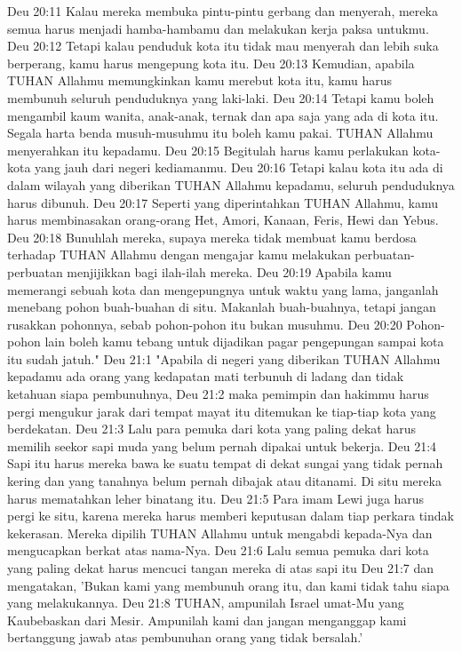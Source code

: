 Deu 20:11  Kalau mereka membuka pintu-pintu gerbang dan menyerah, mereka semua harus menjadi hamba-hambamu dan melakukan kerja paksa untukmu.
Deu 20:12  Tetapi kalau penduduk kota itu tidak mau menyerah dan lebih suka berperang, kamu harus mengepung kota itu.
Deu 20:13  Kemudian, apabila TUHAN Allahmu memungkinkan kamu merebut kota itu, kamu harus membunuh seluruh penduduknya yang laki-laki.
Deu 20:14  Tetapi kamu boleh mengambil kaum wanita, anak-anak, ternak dan apa saja yang ada di kota itu. Segala harta benda musuh-musuhmu itu boleh kamu pakai. TUHAN Allahmu menyerahkan itu kepadamu.
Deu 20:15  Begitulah harus kamu perlakukan kota-kota yang jauh dari negeri kediamanmu.
Deu 20:16  Tetapi kalau kota itu ada di dalam wilayah yang diberikan TUHAN Allahmu kepadamu, seluruh penduduknya harus dibunuh.
Deu 20:17  Seperti yang diperintahkan TUHAN Allahmu, kamu harus membinasakan orang-orang Het, Amori, Kanaan, Feris, Hewi dan Yebus.
Deu 20:18  Bunuhlah mereka, supaya mereka tidak membuat kamu berdosa terhadap TUHAN Allahmu dengan mengajar kamu melakukan perbuatan-perbuatan menjijikkan bagi ilah-ilah mereka.
Deu 20:19  Apabila kamu memerangi sebuah kota dan mengepungnya untuk waktu yang lama, janganlah menebang pohon buah-buahan di situ. Makanlah buah-buahnya, tetapi jangan rusakkan pohonnya, sebab pohon-pohon itu bukan musuhmu.
Deu 20:20  Pohon-pohon lain boleh kamu tebang untuk dijadikan pagar pengepungan sampai kota itu sudah jatuh."
Deu 21:1  "Apabila di negeri yang diberikan TUHAN Allahmu kepadamu ada orang yang kedapatan mati terbunuh di ladang dan tidak ketahuan siapa pembunuhnya,
Deu 21:2  maka pemimpin dan hakimmu harus pergi mengukur jarak dari tempat mayat itu ditemukan ke tiap-tiap kota yang berdekatan.
Deu 21:3  Lalu para pemuka dari kota yang paling dekat harus memilih seekor sapi muda yang belum pernah dipakai untuk bekerja.
Deu 21:4  Sapi itu harus mereka bawa ke suatu tempat di dekat sungai yang tidak pernah kering dan yang tanahnya belum pernah dibajak atau ditanami. Di situ mereka harus mematahkan leher binatang itu.
Deu 21:5  Para imam Lewi juga harus pergi ke situ, karena mereka harus memberi keputusan dalam tiap perkara tindak kekerasan. Mereka dipilih TUHAN Allahmu untuk mengabdi kepada-Nya dan mengucapkan berkat atas nama-Nya.
Deu 21:6  Lalu semua pemuka dari kota yang paling dekat harus mencuci tangan mereka di atas sapi itu
Deu 21:7  dan mengatakan, 'Bukan kami yang membunuh orang itu, dan kami tidak tahu siapa yang melakukannya.
Deu 21:8  TUHAN, ampunilah Israel umat-Mu yang Kaubebaskan dari Mesir. Ampunilah kami dan jangan menganggap kami bertanggung jawab atas pembunuhan orang yang tidak bersalah.'
